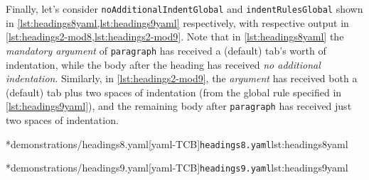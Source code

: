 	Finally, let's consider \texttt{noAdditionalIndentGlobal} and \texttt{indentRulesGlobal} shown in \cref{lst:headings8yaml,lst:headings9yaml}
	respectively, with respective output in \cref{lst:headings2-mod8,lst:headings2-mod9}. Note that in \cref{lst:headings8yaml} the
	\emph{mandatory argument} of \texttt{paragraph} has received a (default) tab's worth of indentation, while the body after the
	heading has received \emph{no additional indentation}. Similarly, in \cref{lst:headings2-mod9}, the \emph{argument} has received both a
	(default) tab plus two spaces of indentation (from the global rule specified in \cref{lst:headings9yaml}), and the remaining body
	after \texttt{paragraph} has received just two spaces of indentation.

	\begin{minipage}{.45\textwidth}
	\end{minipage}%
	\hfill
	\begin{minipage}{.45\textwidth}
		\cmhlistingsfromfile[style=yaml-LST]*{demonstrations/headings8.yaml}[yaml-TCB]{\texttt{headings8.yaml}}{lst:headings8yaml}
	\end{minipage}

	\begin{minipage}{.45\textwidth}
	\end{minipage}%
	\hfill
	\begin{minipage}{.45\textwidth}
		\cmhlistingsfromfile[style=yaml-LST]*{demonstrations/headings9.yaml}[yaml-TCB]{\texttt{headings9.yaml}}{lst:headings9yaml}
	\end{minipage}

